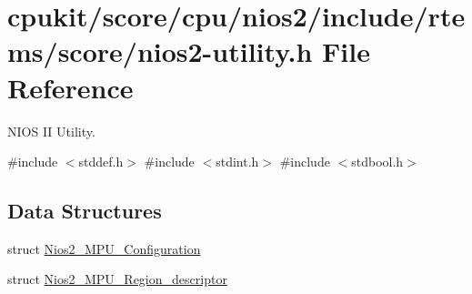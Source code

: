 \hypertarget{nios2-utility_8h}{}\section{cpukit/score/cpu/nios2/include/rtems/score/nios2-\/utility.h File Reference}
\label{nios2-utility_8h}


N\+I\+OS II Utility.  


{\ttfamily \#include $<$stddef.\+h$>$}\newline
{\ttfamily \#include $<$stdint.\+h$>$}\newline
{\ttfamily \#include $<$stdbool.\+h$>$}\newline
\subsection*{Data Structures}
\begin{DoxyCompactItemize}
\item 
struct \mbox{\hyperlink{structNios2__MPU__Configuration}{Nios2\+\_\+\+M\+P\+U\+\_\+\+Configuration}}
\item 
struct \mbox{\hyperlink{structNios2__MPU__Region__descriptor}{Nios2\+\_\+\+M\+P\+U\+\_\+\+Region\+\_\+descriptor}}
\end{DoxyCompactItemize}

